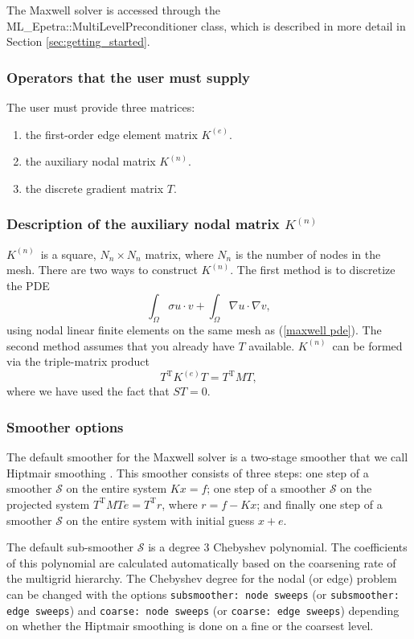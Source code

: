 \documentclass{article}[11pt]
\newcommand{\be}  {\begin{enumerate}}
\newcommand{\ee}  {\end{enumerate}}
\newcommand \Ke {\ensuremath{K^{(e)}}}
\newcommand \Kn {\ensuremath{K^{(n)}}}
\begin{document}
The Maxwell solver is accessed through the
ML\_Epetra::MultiLevelPreconditioner class, which is described in more
detail in Section \ref{sec:getting_started}.

\subsubsection{Operators that the user must supply}
The user must provide three matrices:
\be
\item the first-order edge element matrix \Ke.
\item the auxiliary nodal matrix \Kn.
\item the discrete gradient matrix $T$.
\ee


\subsubsection{Description of the auxiliary nodal matrix \Kn}\label{Kn matrix}
%
\Kn\ is a square, $N_n\times N_n$ matrix, where $N_n$ is the number of nodes in
the mesh.
There are two ways to construct \Kn.
The first method is to discretize the PDE
\begin{equation}
   \int_\Omega \sigma u \cdot v + \int_\Omega \nabla u \cdot \nabla v,
   \label{nodal pde}
\end{equation}
using nodal linear finite elements on the same mesh as (\ref{maxwell pde}).
The second method assumes that you already have $T$ available.
\Kn\ can be formed via the triple-matrix product $$T^{\mathrm{T}}\Ke T =
T^{\mathrm{T}}M T,$$
where we have used the fact that $ST=0$.
%

\subsubsection{Smoother options}\label{maxwell smoothers}
%
The default smoother for the Maxwell solver is a two-stage smoother that we
call Hiptmair smoothing \cite{Hiptmair_1998a}.
This smoother consists of three steps: one step of a smoother $\mathcal S$ on
the entire system $Kx=f$; one step of a smoother $\mathcal S$ on the
projected system $T^{\mathrm{T}}MTe=T^{\mathrm{T}}r$, where $r = f - Kx$;
and finally one step of a smoother $\mathcal S$ on the entire system with
initial guess $x+e$.

The default sub-smoother $\mathcal S$ is a degree 3 Chebyshev
polynomial.
The coefficients of this polynomial are calculated automatically based on the
coarsening rate of the multigrid hierarchy.
The Chebyshev degree for the nodal (or edge) problem can be changed with the 
options \verb!subsmoother: node sweeps!  (or \verb!subsmoother: edge sweeps!)
and \verb!coarse: node sweeps! (or \verb!coarse: edge sweeps!) depending on
whether the Hiptmair smoothing is done on a fine or the coarsest level.
\end{document}
